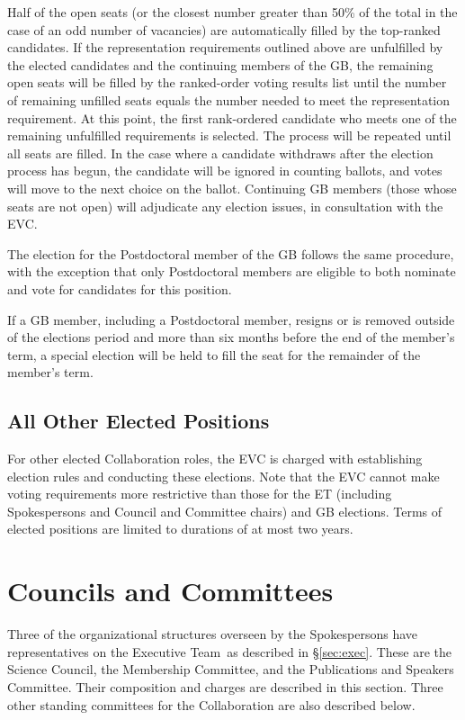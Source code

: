 \documentclass[12pt]{article}
\newcommand{\exec}{{Executive Team}}
\begin{document}
Half of the open seats (or the closest number greater than 50\% of the total in the case of an odd number of vacancies) are automatically filled by the top-ranked candidates. If the representation requirements outlined above are unfulfilled by the elected candidates and the continuing members of the GB, the remaining open seats will be filled by the ranked-order voting results list until the number of remaining unfilled seats equals the number needed to meet the representation requirement.  At this point, the first rank-ordered candidate who meets one of the remaining unfulfilled requirements is selected. The process will be repeated until all seats are filled. In the case where a candidate withdraws after the election process has begun, the candidate will be ignored in counting ballots, and votes will move to the next choice on the ballot. Continuing GB members (those whose seats are not open) will adjudicate any election issues, in consultation with the EVC.

The election for the Postdoctoral member of the GB follows the same procedure, with the exception that only Postdoctoral members are eligible to both nominate and vote for candidates for this position.

If a GB member, including a Postdoctoral member, resigns or is removed outside of the elections period and more than six months before the end of the member's term, a special election will be held to fill the seat for the remainder of the member's term.

\subsection{All Other Elected Positions}

For other elected Collaboration roles, the EVC is charged with establishing election rules and conducting these elections. Note that the EVC cannot make voting requirements more restrictive than those for the ET (including Spokespersons and Council and Committee chairs) and GB elections. Terms of elected positions are limited to durations of at most two years. 

\section{Councils and Committees}
\label{sec:councils}

Three of the organizational structures overseen by the Spokespersons have representatives on the \exec\ as described in \S\ref{sec:exec}.  These are the Science Council, the Membership Committee, and the Publications and Speakers Committee.  Their composition and charges are described in this section.  Three other standing committees for the Collaboration are also described below.  
\end{document}
